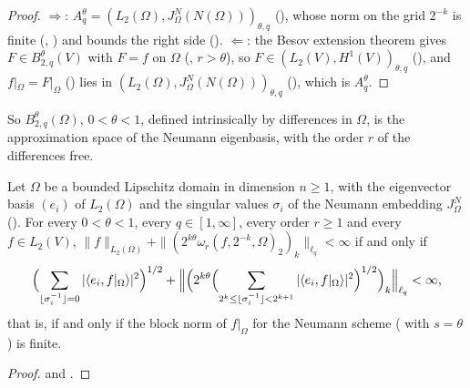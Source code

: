 \begin{proof}
\leanok
$\Rightarrow$: $A^\theta_q = (L_2(\Omega), J^N_\Omega(N(\Omega)))_{\theta, q}$
(), whose norm on the grid $2^{-k}$ is finite
(, ) and bounds the right side
(). $\Leftarrow$: the Besov extension theorem gives
$F \in B^\theta_{2,q}(V)$ with $F = f$ on $\Omega$ (,
$r > \theta$), so $F \in (L_2(V), H^1(V))_{\theta, q}$
(), and
$f|_\Omega = F|_\Omega$ () lies in
$(L_2(\Omega), J^N_\Omega(N(\Omega)))_{\theta, q}$ (), which
is $A^\theta_q$.
\end{proof}

So $B^\theta_{2,q}(\Omega)$, $0 < \theta < 1$, defined intrinsically by differences in $\Omega$,
is the approximation space of the Neumann eigenbasis, with the order $r$ of the differences free.

\begin{corollary}
\label{cor:spectral-besov-neumann-blocks}
\leanok
{}
Let $\Omega$ be a bounded Lipschitz domain in dimension $n \geq 1$, with the eigenvector basis
$(e_i)$ of $L_2(\Omega)$ and the singular values $\sigma_i$ of the Neumann embedding $J^N_\Omega$
(). For every $0 < \theta < 1$, every $q \in [1, \infty]$, every
order $r \geq 1$ and every $f \in L_2(V)$,
$\|f\|_{L_2(\Omega)} + \|(2^{k\theta} \omega_r(f, 2^{-k}, \Omega)_2)_k\|_{\ell_q} < \infty$ if and
only if
\[
  \Bigl(\sum_{\lfloor \sigma_i^{-1} \rfloor = 0} |\langle e_i, f|_\Omega \rangle|^2\Bigr)^{1/2}
  + \Bigl\| \Bigl(2^{k\theta} \Bigl(\sum_{2^k \leq \lfloor \sigma_i^{-1} \rfloor < 2^{k+1}}
    |\langle e_i, f|_\Omega \rangle|^2\Bigr)^{1/2}\Bigr)_k \Bigr\|_{\ell_q} < \infty ,
\]
that is, if and only if the block norm of $f|_\Omega$ for the Neumann scheme
( with $s = \theta$) is finite.
\end{corollary}

\begin{proof}
\leanok
{} and .
\end{proof}

